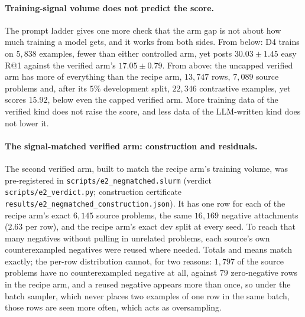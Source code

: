 \paragraph{Training-signal volume does not predict the score.}The prompt ladder gives one more check that the arm gap is not about how much training a model gets, and it works from both sides. From below: D4 trains on $5{,}838$ examples, fewer than either controlled arm, yet posts $30.03 \pm 1.45$ easy R@1 against the verified arm's $17.05 \pm 0.79$. From above: the uncapped verified arm has more of everything than the recipe arm, $13{,}747$ rows, $7{,}089$ source problems and, after its $5\%$ development split, $22{,}346$ contrastive examples, yet scores $15.92$, below even the capped verified arm. More training data of the verified kind does not raise the score, and less data of the LLM-written kind does not lower it.

\paragraph{The signal-matched verified arm: construction and residuals.}The second verified arm, built to match the recipe arm's training volume, was pre-registered in \texttt{scripts/e2\_negmatched.slurm} (verdict \texttt{scripts/e2\_verdict.py}; construction certificate \texttt{results/e2\_negmatched\_construction.json}). It has one row for each of the recipe arm's exact $6{,}145$ source problems, the same $16{,}169$ negative attachments ($2.63$ per row), and the recipe arm's exact dev split at every seed. To reach that many negatives without pulling in unrelated problems, each source's own counterexampled negatives were reused where needed. Totals and means match exactly; the per-row distribution cannot, for two reasons: $1{,}797$ of the source problems have no counterexampled negative at all, against $79$ zero-negative rows in the recipe arm, and a reused negative appears more than once, so under the batch sampler, which never places two examples of one row in the same batch, those rows are seen more often, which acts as oversampling.

